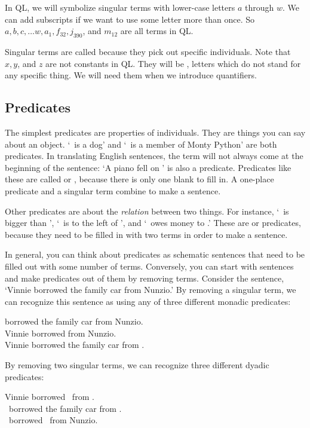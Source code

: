 In QL, we will symbolize singular terms with lower-case letters $a$ through $w$. We can add subscripts if we want to use some letter more than once. So $a,b,c,\ldots w, a_1, f_{32}, j_{390}$, and $m_{12}$ are all terms in QL.

Singular terms are called  because they pick out specific individuals. Note that $x, y$, and $z$ are not constants in QL. They will be , letters which do not stand for any specific thing. We will need them when we introduce quantifiers.

\subsection{Predicates}
The simplest predicates are properties of individuals. They are things you can say about an object. `\blank\ is a dog' and `\blank\ is a member of Monty Python' are both predicates. In translating English sentences, the term will not always come at the beginning of the sentence: `A piano fell on \blank' is also a predicate. Predicates like these are called  or , because there is only one blank to fill in. A one-place predicate and a singular term combine to make a sentence.

Other predicates are about the \emph{relation} between two things. For instance, `\blank\ is bigger than \blank', `\blank\ is to the left of \blank', and `\blank\ owes money to \blank.' These are  or  predicates, because they need to be filled in with two terms in order to make a sentence.

In general, you can think about predicates as schematic sentences that need to be filled out with some number of terms. Conversely, you can start with sentences and make predicates out of them by removing terms. Consider the sentence, `Vinnie borrowed the family car from Nunzio.' By removing a singular term, we can recognize this sentence as using any of three different monadic predicates:
\begin{center}
\blank borrowed the family car from Nunzio.\\
Vinnie borrowed \blank from Nunzio.\\
Vinnie borrowed the family car from \blank.
\end{center}

By removing two singular terms, we can recognize three different dyadic predicates:
\begin{center}
Vinnie borrowed \blank\ from \blank.\\
\blank\ borrowed the family car from \blank.\\
\blank\ borrowed \blank\ from Nunzio.
\end{center}

